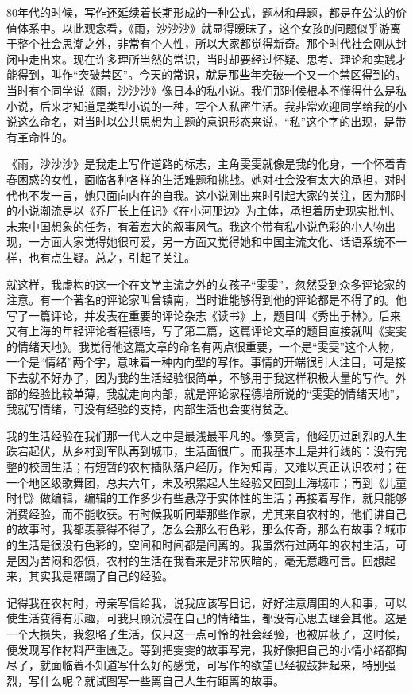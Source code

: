 \documentclass[12pt,a5paper]{ctexbook}
\begin{document}
80年代的时候，写作还延续着长期形成的一种公式，题材和母题，都是在公认的价值体系中。以此观念看，《雨，沙沙沙》就显得暧昧了，这个女孩的问题似乎游离于整个社会思潮之外，非常有个人性，所以大家都觉得新奇。那个时代社会刚从封闭中走出来。现在许多理所当然的常识，当时却要经过怀疑、思考、理论和实践才能得到，叫作“突破禁区”。今天的常识，就是那些年突破一个又一个禁区得到的。当时有个同学说《雨，沙沙沙》像日本的私小说。我们那时候根本不懂得什么是私小说，后来才知道是类型小说的一种，写个人私密生活。我非常欢迎同学给我的小说这么命名，对当时以公共思想为主题的意识形态来说，“私”这个字的出现，是带有革命性的。

《雨，沙沙沙》是我走上写作道路的标志，主角雯雯就像是我的化身，一个怀着青春困惑的女性，面临各种各样的生活难题和挑战。她对社会没有太大的承担，对时代也不发一言，她只面向内在的自我。这小说刚出来时引起大家的关注，因为那时的小说潮流是以《乔厂长上任记》《在小河那边》为主体，承担着历史现实批判、未来中国想象的任务，有着宏大的叙事风气。我这个带有私小说色彩的小人物出现，一方面大家觉得她很可爱，另一方面又觉得她和中国主流文化、话语系统不一样，也有点生疑。总之，引起了关注。

就这样，我虚构的这一个在文学主流之外的女孩子“雯雯”，忽然受到众多评论家的注意。有一个著名的评论家叫曾镇南，当时谁能够得到他的评论都是不得了的。他写了一篇评论，并发表在重要的评论杂志《读书》上，题目叫《秀出于林》。后来又有上海的年轻评论者程德培，写了第二篇，这篇评论文章的题目直接就叫《雯雯的情绪天地》。我觉得他这篇文章的命名有两点很重要，一个是“雯雯”这个人物，一个是“情绪”两个字，意味着一种内向型的写作。事情的开端很引人注目，可是接下去就不好办了，因为我的生活经验很简单，不够用于我这样积极大量的写作。外部的经验比较单薄，我就走向内部，就是评论家程德培所说的“雯雯的情绪天地”，我就写情绪，可没有经验的支持，内部生活也会变得贫乏。

我的生活经验在我们那一代人之中是最浅最平凡的。像莫言，他经历过剧烈的人生跌宕起伏，从乡村到军队再到城市，生活面很广。而我基本上是并行线的：没有完整的校园生活；有短暂的农村插队落户经历，作为知青，又难以真正认识农村；在一个地区级歌舞团，总共六年，未及积累起人生经验又回到上海城市；再到《儿童时代》做编辑，编辑的工作多少有些悬浮于实体性的生活；再接着写作，就只能够消费经验，而不能收获。有时候我听同辈那些作家，尤其来自农村的，他们讲自己的故事时，我都羡慕得不得了，怎么会那么有色彩，那么传奇，那么有故事？城市的生活是很没有色彩的，空间和时间都是间离的。我虽然有过两年的农村生活，可是因为苦闷和怨愤，农村的生活在我看来是非常灰暗的，毫无意趣可言。回想起来，其实我是糟蹋了自己的经验。

记得我在农村时，母亲写信给我，说我应该写日记，好好注意周围的人和事，可以使生活变得有乐趣，可我只顾沉浸在自己的情绪里，都没有心思去理会其他。这是一个大损失，我忽略了生活，仅只这一点可怜的社会经验，也被屏蔽了，这时候，便发现写作材料严重匮乏。等到把雯雯的故事写完，我好像把自己的小情小绪都掏尽了，就面临着不知道写什么好的感觉，可写作的欲望已经被鼓舞起来，特别强烈，写什么呢？就试图写一些离自己人生有距离的故事。
\end{document}
